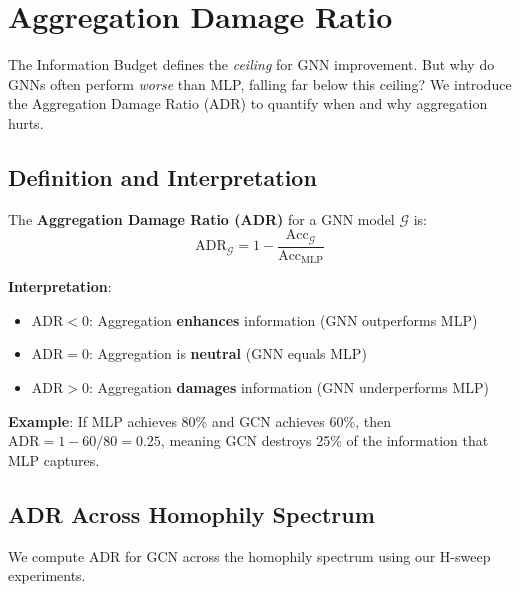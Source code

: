 
\section{Aggregation Damage Ratio}
\label{sec:adr}

The Information Budget defines the \textit{ceiling} for GNN improvement. But why do GNNs often perform \textit{worse} than MLP, falling far below this ceiling? We introduce the Aggregation Damage Ratio (ADR) to quantify when and why aggregation hurts.

\subsection{Definition and Interpretation}

\begin{definition}
\label{def:adr}
The \textbf{Aggregation Damage Ratio (ADR)} for a GNN model $\mathcal{G}$ is:
\begin{equation}
    \text{ADR}_{\mathcal{G}} = 1 - \frac{\text{Acc}_{\mathcal{G}}}{\text{Acc}_{\text{MLP}}}
\end{equation}
\end{definition}

\textbf{Interpretation}:
\begin{itemize}
    \item $\text{ADR} < 0$: Aggregation \textbf{enhances} information (GNN outperforms MLP)
    \item $\text{ADR} = 0$: Aggregation is \textbf{neutral} (GNN equals MLP)
    \item $\text{ADR} > 0$: Aggregation \textbf{damages} information (GNN underperforms MLP)
\end{itemize}

\textbf{Example}: If MLP achieves 80\% and GCN achieves 60\%, then $\text{ADR} = 1 - 60/80 = 0.25$, meaning GCN destroys 25\% of the information that MLP captures.

\subsection{ADR Across Homophily Spectrum}

We compute ADR for GCN across the homophily spectrum using our H-sweep experiments.

